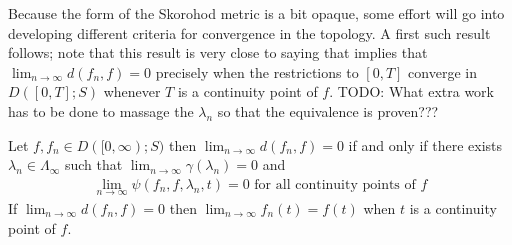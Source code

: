  Because the form of the Skorohod metric is a bit opaque, some effort will go into developing different criteria for convergence
in the topology.  A first such result follows; note that this result is very close to saying that implies that $\lim_{n \to \infty} d(f_n,f) = 0$ precisely when the restrictions
to $[0,T]$ converge in $D([0,T];S)$ whenever $T$ is a continuity point of $f$.  TODO: What extra work has to be done to massage the $\lambda_n$ so that the equivalence is proven???

\begin{prop}\label{SkorohodInfiniteJ1EquivalenceA}Let $f,f_n \in D([0,\infty); S)$ then $\lim_{n \to \infty} d(f_n,f) = 0$ if and only if there exists $\lambda_n \in \Lambda_\infty$ such that $\lim_{n \to \infty} \gamma(\lambda_n) = 0$ and 
\begin{align*}
\lim_{n \to \infty} \psi(f_n,f,\lambda_n,t) = 0 \text{ for all continuity points of $f$}
\end{align*}
If $\lim_{n \to \infty} d(f_n,f) = 0$ then $\lim_{n \to \infty} f_n(t) = f(t)$ when $t$ is a continuity point of $f$.
\end{prop}
